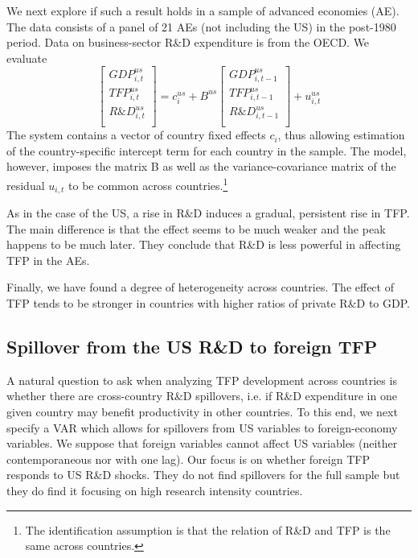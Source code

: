 \documentclass{article}
\begin{document}
We next explore if such a result holds in a sample of advanced economies (AE). The data consists of a panel of 21 AEs (not including the US) in the post-1980 period. Data on business-sector R\&D expenditure is from the OECD. We evaluate
\begin{equation}
\begin{bmatrix}
GDP_{i,t}^{us} \\
TFP_{i,t}^{us} \\
R\&D_{i,t}^{us} \\
\end{bmatrix} = c_i^{us} + B^{us} \begin{bmatrix}
GDP_{i,t-1}^{us} \\
TFP_{i,t-1}^{us} \\
R\&D_{i,t-1}^{us} \\ 
\end{bmatrix} + u_{i,t}^{us}
\end{equation}
The system contains a vector of country fixed effects $c_i$, thus allowing estimation of the country-specific intercept term for each country in the sample. The model, however, imposes the matrix B as well as the variance-covariance matrix of the residual $u_{i,t}$ to be common across countries.\footnote{The identification assumption is that the relation of R\&D and TFP is the same across countries.}

As in the case of the US, a rise in R\&D induces a gradual, persistent rise in TFP. The main difference is that the effect seems to be much weaker and the peak happens to be much later. They conclude that R\&D is less powerful in affecting TFP in the AEs. 

Finally, we have found a degree of heterogeneity across countries. The effect of TFP tends to be stronger in countries with higher ratios of private R\&D to GDP.

\subsection*{Spillover from the US R\&D to foreign TFP}

A natural question to ask when analyzing TFP development across countries is whether there are cross-country R\&D spillovers, i.e. if R\&D expenditure in one given country may benefit productivity in other countries. To this end, we next specify a VAR which allows for spillovers from US variables to foreign-economy variables. We suppose that foreign variables cannot affect US variables (neither contemporaneous nor with one lag). Our focus is on whether foreign TFP responds to US R\&D shocks. They do not find spillovers for the full sample but they do find it focusing on high research intensity countries.
\end{document}
